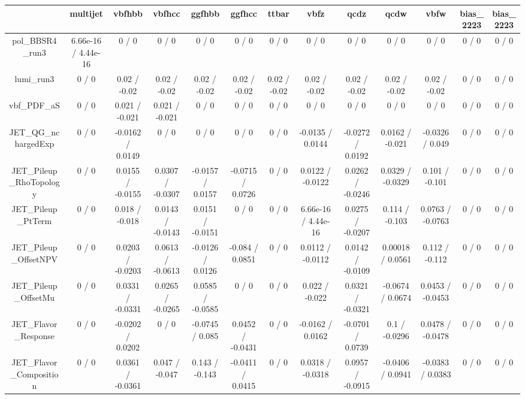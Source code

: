 \documentclass[10pt]{article}
\begin{document}
\begin{table}[htbp]
\begin{center}
\begin{tabular}{|c|c|c|c|c|c|c|c|c|c|c|c|c|}
\hline 
      & multijet      & vbfhbb      & vbfhcc      & ggfhbb      & ggfhcc      & ttbar      & vbfz      & qcdz      & qcdw      & vbfw      & bias_2223      & bias_2223 \\ 
\hline 
  pol_BBSR4_run3 & 6.66e-16 / 4.44e-16 & 0 / 0 & 0 / 0 & 0 / 0 & 0 / 0 & 0 / 0 & 0 / 0 & 0 / 0 & 0 / 0 & 0 / 0 & 0 / 0 & 0 / 0 \\ 
  lumi_run3 & 0 / 0 & 0.02 / -0.02 & 0.02 / -0.02 & 0.02 / -0.02 & 0.02 / -0.02 & 0.02 / -0.02 & 0.02 / -0.02 & 0.02 / -0.02 & 0.02 / -0.02 & 0.02 / -0.02 & 0 / 0 & 0 / 0 \\ 
  vbf_PDF_aS & 0 / 0 & 0.021 / -0.021 & 0.021 / -0.021 & 0 / 0 & 0 / 0 & 0 / 0 & 0 / 0 & 0 / 0 & 0 / 0 & 0 / 0 & 0 / 0 & 0 / 0 \\ 
  JET_QG_nchargedExp & 0 / 0 & -0.0162 / 0.0149 & 0 / 0 & 0 / 0 & 0 / 0 & 0 / 0 & -0.0135 / 0.0144 & -0.0272 / 0.0192 & 0.0162 / -0.021 & -0.0326 / 0.049 & 0 / 0 & 0 / 0 \\ 
  JET_Pileup_RhoTopology & 0 / 0 & 0.0155 / -0.0155 & 0.0307 / -0.0307 & -0.0157 / 0.0157 & -0.0715 / 0.0726 & 0 / 0 & 0.0122 / -0.0122 & 0.0262 / -0.0246 & 0.0329 / -0.0329 & 0.101 / -0.101 & 0 / 0 & 0 / 0 \\ 
  JET_Pileup_PtTerm & 0 / 0 & 0.018 / -0.018 & 0.0143 / -0.0143 & 0.0151 / -0.0151 & 0 / 0 & 0 / 0 & 6.66e-16 / 4.44e-16 & 0.0275 / -0.0207 & 0.114 / -0.103 & 0.0763 / -0.0763 & 0 / 0 & 0 / 0 \\ 
  JET_Pileup_OffsetNPV & 0 / 0 & 0.0203 / -0.0203 & 0.0613 / -0.0613 & -0.0126 / 0.0126 & -0.084 / 0.0851 & 0 / 0 & 0.0112 / -0.0112 & 0.0142 / -0.0109 & 0.00018 / 0.0561 & 0.112 / -0.112 & 0 / 0 & 0 / 0 \\ 
  JET_Pileup_OffsetMu & 0 / 0 & 0.0331 / -0.0331 & 0.0265 / -0.0265 & 0.0585 / -0.0585 & 0 / 0 & 0 / 0 & 0.022 / -0.022 & 0.0321 / -0.0321 & -0.0674 / 0.0674 & 0.0453 / -0.0453 & 0 / 0 & 0 / 0 \\ 
  JET_Flavor_Response & 0 / 0 & -0.0202 / 0.0202 & 0 / 0 & -0.0745 / 0.085 & 0.0452 / -0.0431 & 0 / 0 & -0.0162 / 0.0162 & -0.0701 / 0.0739 & 0.1 / -0.0296 & 0.0478 / -0.0478 & 0 / 0 & 0 / 0 \\ 
  JET_Flavor_Composition & 0 / 0 & 0.0361 / -0.0361 & 0.047 / -0.047 & 0.143 / -0.143 & -0.0411 / 0.0415 & 0 / 0 & 0.0318 / -0.0318 & 0.0957 / -0.0915 & -0.0406 / 0.0941 & -0.0383 / 0.0383 & 0 / 0 & 0 / 0 \\ 

\end{tabular}
\end{center}
\end{table}
\end{document}
